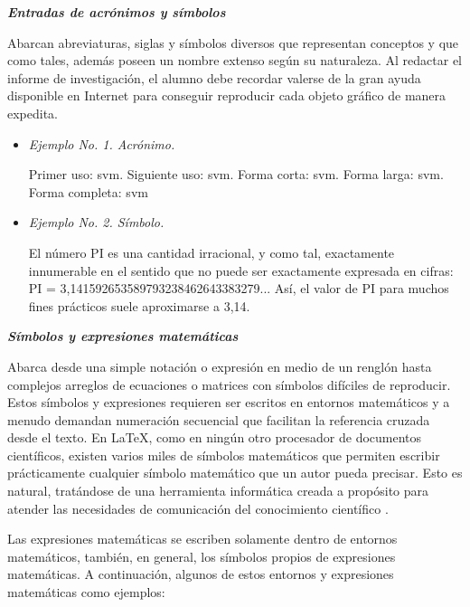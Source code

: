 \textit{\textbf{Entradas de acrónimos y símbolos}}

Abarcan abreviaturas, siglas y símbolos diversos que representan conceptos y que como tales, además poseen un nombre extenso según su naturaleza. Al redactar el informe de investigación, el alumno debe recordar valerse de la gran ayuda disponible en Internet para conseguir reproducir cada objeto gráfico de manera expedita.
\begin{itemize}
\item \textit{Ejemplo No. 1. Acrónimo.}

Primer uso: \gls{svm}\@. Siguiente uso: \gls{svm}\@. Forma corta: \acrshort{svm}\@. Forma larga: \acrlong{svm}\@. Forma completa: \acrfull{svm}\@ 
{} %

\item \textit{Ejemplo No. 2. Símbolo.}


El número \gls{PI} es una cantidad irracional, y como tal, exactamente innumerable en el sentido que no puede ser exactamente expresada en cifras: \gls{PI} = 3,141592653589793238462643383279...  Así, el valor de \gls{PI} para muchos fines prácticos suele aproximarse a 3,14.

\end{itemize}

\textit{\textbf{Símbolos y expresiones matemáticas}}


Abarca desde una simple notación o expresión en medio de un renglón hasta complejos arreglos de ecuaciones o matrices con símbolos difíciles de reproducir. Estos símbolos y expresiones requieren ser escritos en entornos matemáticos y a menudo demandan numeración secuencial que facilitan la referencia cruzada desde el texto. En \LaTeX, como en ningún otro procesador de documentos científicos, existen varios miles de símbolos matemáticos que permiten escribir prácticamente cualquier símbolo matemático que un autor pueda precisar. Esto es natural, tratándose de una herramienta informática creada a propósito para atender las necesidades de comunicación del conocimiento científico \cite{knuth, lamport}.


Las expresiones matemáticas se escriben solamente dentro de entornos matemáticos, también, en general, los símbolos propios de expresiones matemáticas. A continuación, algunos de estos entornos y expresiones matemáticas como ejemplos:

